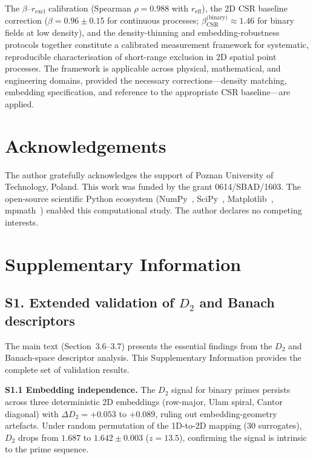 \documentclass[final,3p,times,twocolumn]{elsarticle}
\theoremstyle{definition}
\begin{document}
The $\beta$--$r_{\text{excl}}$ calibration (Spearman $\rho=0.988$ with
$r_{\text{eff}}$), the 2D CSR baseline correction
($\beta=0.96\pm0.15$ for continuous processes;
$\beta_{\text{CSR}}^{\text{(binary)}}\approx1.46$ for binary fields
at low density), and the density-thinning and embedding-robustness
protocols together constitute a calibrated measurement framework for
systematic, reproducible characterisation of short-range exclusion in
2D spatial point processes. The framework is applicable across
physical, mathematical, and engineering domains, provided the
necessary corrections---density matching, embedding specification,
and reference to the appropriate CSR baseline---are applied.

\section*{Acknowledgements}
The author gratefully acknowledges the support of Poznan University
of Technology, Poland. This work was funded by the grant
0614/SBAD/1603. The open-source scientific Python ecosystem
(NumPy~\cite{HARRIS-2020}, SciPy~\cite{VIRTANEN-2020},
Matplotlib~\cite{HUNTER-2007}, mpmath~\cite{MPMATH}) enabled
this computational study. The author declares no competing interests.

\section*{Supplementary Information}

\subsection*{S1. Extended validation of $D_2$ and Banach descriptors}

The main text (Section~3.6--3.7) presents the essential findings from
the $D_2$ and Banach-space descriptor analysis. This Supplementary
Information provides the complete set of validation results.

\textbf{S1.1 Embedding independence.} The $D_2$ signal for binary primes
persists across three deterministic 2D embeddings (row-major, Ulam spiral,
Cantor diagonal) with $\Delta D_2 = +0.053$ to $+0.089$, ruling out
embedding-geometry artefacts. Under random permutation of the 1D-to-2D
mapping (30 surrogates), $D_2$ drops from $1.687$ to $1.642 \pm 0.003$
($z = 13.5$), confirming the signal is intrinsic to the prime sequence.
\end{document}
